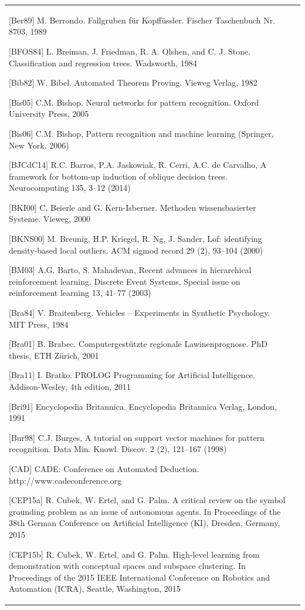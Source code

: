 \documentclass[10pt]{book}
\begin{document}
\begin{tabular}{|l|l|}
[Ber89] M. Berrondo. Fallgruben für Kopffüssler. Fischer Taschenbuch Nr. 8703, 1989

[BFOS84] L. Breiman, J. Friedman, R. A. Olshen, and C. J. Stone. Classification and regression trees. Wadsworth, 1984

[Bib82] W. Bibel. Automated Theorem Proving. Vieweg Verlag, 1982

[Bis05] C.M. Bishop. Neural networks for pattern recognition. Oxford University Press, 2005

[Bis06] C.M. Bishop, Pattern recognition and machine learning (Springer, New York, 2006)

[BJCdC14] R.C. Barros, P.A. Jaskowiak, R. Cerri, A.C. de Carvalho, A framework for bottom-up induction of oblique decision trees. Neurocomputing 135, 3–12 (2014)

[BKI00] C. Beierle and G. Kern-Isberner. Methoden wissensbasierter Systeme. Vieweg, 2000

[BKNS00] M. Breunig, H.P. Kriegel, R. Ng, J. Sander, Lof: identifying density-based local outliers. ACM sigmod record 29 (2), 93–104 (2000)

[BM03] A.G. Barto, S. Mahadevan, Recent advances in hierarchical reinforcement learning. Discrete Event Systems, Special issue on reinforcement learning 13, 41–77 (2003)

[Bra84] V. Braitenberg. Vehicles – Experiments in Synthetic Psychology. MIT Press, 1984

[Bra01] B. Brabec. Computergestützte regionale Lawinenprognose. PhD thesis, ETH Zürich, 2001

[Bra11] I. Bratko. PROLOG Programming for Artificial Intelligence. Addison-Wesley, 4th edition, 2011

[Bri91] Encyclopedia Britannica. Encyclopedia Britannica Verlag, London, 1991

[Bur98] C.J. Burges, A tutorial on support vector machines for pattern recognition. Data Min. Knowl. Discov. 2 (2), 121–167 (1998)

[CAD] CADE: Conference on Automated Deduction. http://www.cadeconference.org

[CEP15a] R. Cubek, W. Ertel, and G. Palm. A critical review on the symbol grounding problem as an issue of autonomous agents. In Proceedings of the 38th German Conference on Artificial Intelligence (KI), Dresden, Germany, 2015

[CEP15b] R. Cubek, W. Ertel, and G. Palm. High-level learning from demonstration with conceptual spaces and subspace clustering. In Proceedings of the 2015 IEEE International Conference on Robotics and Automation (ICRA), Seattle, Washington, 2015


\end{tabular}
\end{document}
